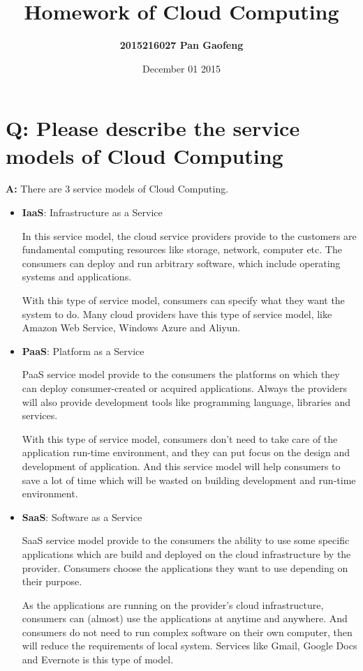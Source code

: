 \documentclass[a4paper]{article}
\title{Homework of Cloud Computing}
\author{\Large \textbf{2015216027 \hspace{2cm} Pan Gaofeng}}
\date{December 01 2015}
\begin{document}
\Large
\maketitle

\section{ Q: Please describe the service models of Cloud Computing}

\hspace{1cm}\textbf{A:} There are 3 service models of Cloud Computing.

\begin{itemize}
\item \textbf{IaaS}: Infrastructure as a Service

In this service model, the cloud service providers provide to the customers are fundamental computing resources like storage, network, computer etc. The consumers can deploy and run arbitrary software, which include operating systems and applications. 

With this type of service model, consumers can specify what they want the system to do. Many cloud providers have this type of service model, like Amazon Web Service, Windows Azure and Aliyun.

\vspace{1mm} 

\item \textbf{PaaS}: Platform as a Service

PaaS service model provide to the consumers the platforms on which they can deploy consumer-created or acquired applications. Always the providers will also provide development tools like programming language, libraries and services.

With this type of service model, consumers don't need to take care of the application run-time environment, and they can put focus on the design and development of application. And this service model will help consumers to save a lot of time which will be wasted on building development and run-time environment.

\vspace{1mm} 

\item \textbf{SaaS}: Software as a Service

SaaS service model provide to the consumers the ability to use some specific applications which are build and deployed on the cloud infrastructure by the provider. Consumers choose the applications they want to use depending on their purpose.

As the applications are running on the provider's cloud infrastructure, consumers can (almost) use the applications at anytime and anywhere. And consumers do not need to run complex software on their own computer, then will reduce the requirements of local system. Services like Gmail, Google Docs and Evernote is this type of model.

\end{itemize}
\end{document}
